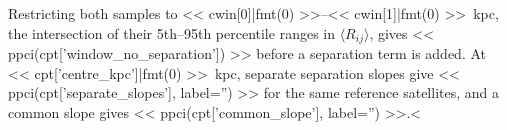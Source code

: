 \documentclass{aa}
\newcommand{\CC}{Control\textsubscript{4C}}
\newcommand{\CG}{CG\textsubscript{4}}
\newcommand{\Rmed}{\langle R_{ij}\rangle}
\begin{document}
Restricting both samples to << cwin[0]|fmt(0) >>--<< cwin[1]|fmt(0) >>~kpc, the intersection of their 5th--95th percentile ranges in \(\Rmed\), gives << ppci(cpt['window_no_separation']) >> before a separation term is added. At << cpt['centre_kpc']|fmt(0) >>~kpc, separate separation slopes give << ppci(cpt['separate_slopes'], label='') >> for the same reference satellites, and a common slope gives << ppci(cpt['common_slope'], label='') >>.<%
\end{document}

